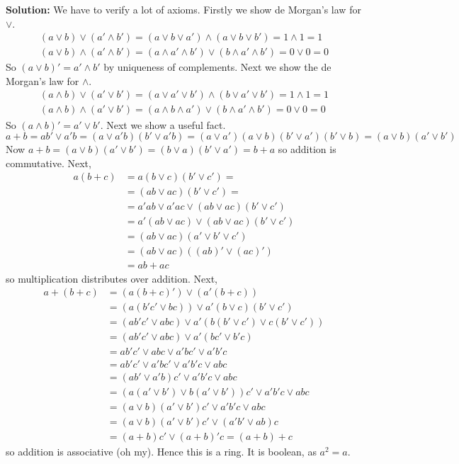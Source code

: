 \documentclass{article}
\begin{document}
\noindent\textbf{Solution:}
We have to verify a lot of axioms.
Firstly we show de Morgan's law for \(\lor\).
\begin{align*}
    (a \lor b) \lor (a' \land b') = (a \lor b \lor a') \land (a \lor b \lor b') = 1 \land 1 = 1 \\
    (a \lor b) \land (a' \land b') = (a \land a' \land b') \lor (b \land a' \land b') = 0 \lor 0 = 0
\end{align*}
So \((a \lor b)' = a' \land b'\) by uniqueness of complements.
Next we show the de Morgan's law for \(\land\).
\begin{align*}
    (a \land b) \lor (a' \lor b') = (a \lor a' \lor b') \land (b \lor a' \lor b') = 1 \land 1 = 1 \\
    (a \land b) \land (a' \lor b') = (a \land b \land a') \lor (b \land a' \land b') = 0 \lor 0 = 0 
\end{align*}
So \((a \land b)' = a' \lor b'\).
Next we show a useful fact.
\[
    a + b = ab' \lor a'b = (a \lor a'b) (b' \lor a'b) = (a \lor a') (a \lor b) (b' \lor a') (b' \lor b) = (a \lor b) (a' \lor b')
\]
Now \(a + b = (a \lor b) (a' \lor b') = (b \lor a) (b' \lor a') = b + a\) so addition is commutative.
Next,
\begin{align*}
    a (b + c)
    &= a (b \lor c) (b' \lor c') = \\
    &= (ab \lor ac) (b' \lor c') = \\
    &= a'ab \lor a'ac \lor (ab \lor ac) (b' \lor c') \\
    &= a'(ab \lor ac) \lor (ab \lor ac) (b' \lor c') \\
    &= (ab \lor ac) (a' \lor b' \lor c') \\
    &= (ab \lor ac) ((ab)' \lor (ac)') \\
    &= ab + ac
\end{align*}
so multiplication distributes over addition.
Next,
\begin{align*}
    a + (b + c) &= (a (b + c)') \lor (a' (b + c)) \\
                &= (a (b'c' \lor bc)) \lor a' (b \lor c)(b' \lor c') \\
                &= (a b'c' \lor abc) \lor a'(b (b' \lor c') \lor c (b' \lor c')) \\
                &= (a b'c' \lor abc) \lor a'(bc' \lor b'c) \\
                &= a b'c' \lor abc \lor a'bc' \lor a'b'c \\
                &= ab'c' \lor a'bc' \lor a'b'c \lor abc \\
                &= (ab' \lor a'b)c' \lor a'b'c \lor abc \\
                &= (a(a' \lor b') \lor b(a' \lor b'))c' \lor a'b'c \lor abc \\
                &= (a \lor b)(a' \lor b')c' \lor a'b'c \lor abc \\
                &= (a \lor b)(a' \lor b')c' \lor (a'b' \lor ab) c \\
                &= (a + b)c' \lor (a + b)' c = (a + b) + c
\end{align*}
so addition is associative (oh my).
Hence this is a ring.
It is boolean, as \(a^2 = a\).
\end{document}
